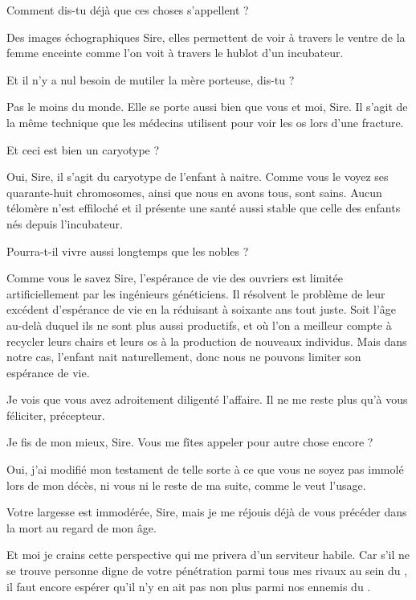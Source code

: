 \begin{drama}
  \elenaspeaks {} Comment dis-tu déjà que ces choses s’appellent ?

  \alexasspeaks Des images échographiques Sire, elles permettent de voir à travers le ventre de la femme enceinte comme l’on voit à travers le hublot d’un incubateur.

  \elenaspeaks Et il n’y a nul besoin de mutiler la mère porteuse, dis-tu ?

  \alexasspeaks Pas le moins du monde. Elle se porte aussi bien que vous et moi, Sire. Il s’agit de la même technique que les médecins utilisent pour voir les os lors d’une fracture.

  \elenaspeaks Et ceci est bien un caryotype ?

  \alexasspeaks Oui, Sire, il s’agit du caryotype de l’enfant à naitre. Comme vous le voyez ses quarante-huit chromosomes, ainsi que nous en avons tous, sont sains. Aucun télomère n’est effiloché et il présente une santé aussi stable que celle des enfants nés depuis l’incubateur. 

  \elenaspeaks Pourra-t-il vivre aussi longtemps que les nobles ?

  \alexasspeaks Comme vous le savez Sire, l’espérance de vie des ouvriers  est limitée artificiellement par les ingénieurs généticiens. Il résolvent le problème de leur excédent d’espérance de vie en la réduisant à soixante ans tout juste. Soit l’âge au-delà duquel ils ne sont plus aussi productifs, et où l’on a meilleur compte à recycler leurs chairs et leurs os à la production de nouveaux individus. Mais dans notre cas, l’enfant nait naturellement, donc nous ne pouvons limiter son espérance de vie.

  \elenaspeaks Je vois que vous avez adroitement diligenté l’affaire. Il ne me reste plus qu’à vous féliciter, précepteur.

  \alexasspeaks Je fis de mon mieux, Sire. Vous me fîtes appeler pour autre chose encore ?

  \elenaspeaks Oui, j’ai modifié mon testament de telle sorte à ce que vous ne soyez pas immolé lors de mon décès, ni vous ni le reste de ma suite, comme le veut l’usage.

  \alexasspeaks Votre largesse est immodérée, Sire, mais je me réjouis déjà de vous précéder dans la mort au regard de mon âge.

  \elenaspeaks Et moi je crains cette perspective qui me privera d’un serviteur habile. Car s’il ne se trouve personne digne de votre pénétration parmi tous mes rivaux au sein du \campprincipal{}, il faut encore espérer qu’il n’y en ait pas non plus parmi nos ennemis du \campoppose{}.


\end{drama}
